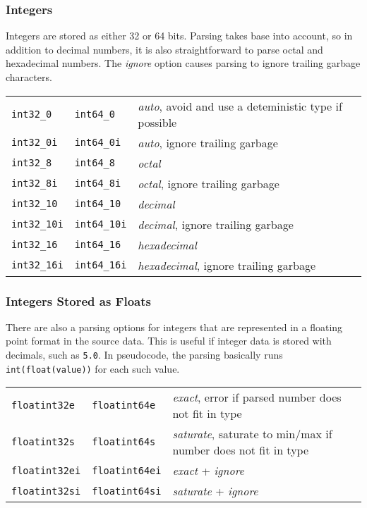 \subsubsection{Integers}
Integers are stored as either 32 or 64 bits.  Parsing takes base into
account, so in addition to decimal numbers, it is also straightforward
to parse octal and hexadecimal numbers.  The \emph{ignore} option
causes parsing to ignore trailing garbage characters.
\begin{leftbar}
\begin{tabular}{p{2cm}p{2cm}p{9cm}}
  \texttt{int32\_0}   & \texttt{int64\_0}   & \emph{auto}, avoid and use a deteministic type if possible \\
  \texttt{int32\_0i}  & \texttt{int64\_0i}  & \emph{auto}, ignore trailing garbage \\
  \texttt{int32\_8}   & \texttt{int64\_8}   & \emph{octal} \\
  \texttt{int32\_8i}  & \texttt{int64\_8i}  & \emph{octal}, ignore trailing garbage \\
  \texttt{int32\_10}  & \texttt{int64\_10}  & \emph{decimal} \\
  \texttt{int32\_10i} & \texttt{int64\_10i} & \emph{decimal}, ignore trailing garbage \\
  \texttt{int32\_16}  & \texttt{int64\_16}  & \emph{hexadecimal} \\
  \texttt{int32\_16i} & \texttt{int64\_16i} & \emph{hexadecimal}, ignore trailing garbage \\
\end{tabular}
\end{leftbar}



\subsubsection{Integers Stored as Floats}
There are also a parsing options for integers that are represented in
a floating point format in the source data.  This is useful if integer
data is stored with decimals, such as \texttt{5.0}.  In pseudocode,
the parsing basically runs \texttt{int(float(value))} for each such
value.
\begin{leftbar}
\begin{tabular}{p{2cm}p{2cm}p{9cm}}
  \texttt{floatint32e} & \texttt{floatint64e}  & \emph{exact}, error if parsed number does not fit in type\\
  \texttt{floatint32s} & \texttt{floatint64s}  & \emph{saturate}, saturate to min/max if number does not fit in type\\
  \texttt{floatint32ei}& \texttt{floatint64ei} & \emph{exact} + \emph{ignore}\\
  \texttt{floatint32si}& \texttt{floatint64si} & \emph{saturate} + \emph{ignore}\\
\end{tabular}
\end{leftbar}



